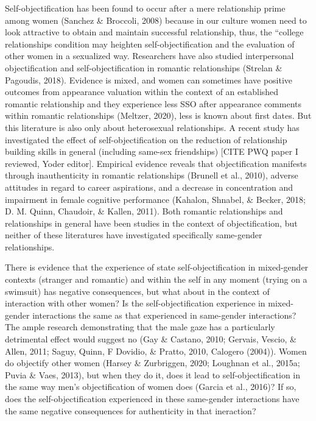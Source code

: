\documentclass[man]{apa6}
\begin{document}
Self-objectification has been found to occur after a mere relationship
prime among women (Sanchez \& Broccoli, 2008) because in our culture
women need to look attractive to obtain and maintain successful
relationship, thus, the ``college relationships condition may heighten
self-objectification and the evaluation of other women in a sexualized
way. Researchers have also studied interpersonal objectification and
self-objectification in romantic relationships (Strelan \& Pagoudis,
2018). Evidence is mixed, and women can sometimes have positive outcomes
from appearance valuation within the context of an established romantic
relationship and they experience less SSO after appearance comments
within romantic relationships (Meltzer, 2020), less is known about first
dates. But this literature is also only about heterosexual
relationships. A recent study has investigated the effect of
self-objectification on the reduction of relationship building skills in
general (including same-sex friendships) {[}CITE PWQ paper I reviewed,
Yoder editor{]}. Empirical evidence reveals that objectification
manifests through inauthenticity in romantic relationships (Brunell et
al., 2010), adverse attitudes in regard to career aspirations, and a
decrease in concentration and impairment in female cognitive performance
(Kahalon, Shnabel, \& Becker, 2018; D. M. Quinn, Chaudoir, \& Kallen,
2011). Both romantic relationships and relationships in general have
been studies in the context of objectification, but neither of these
literatures have investigated specifically same-gender relationships.

There is evidence that the experience of state self-objectification in
mixed-gender contexts (stranger and romantic) and within the self in any
moment (trying on a swimsuit) has negative consequences, but what about
in the context of interaction with other women? Is the
self-objectification experience in mixed-gender interactions the same as
that experienced in same-gender interactions? The ample research
demonstrating that the male gaze has a particularly detrimental effect
would suggest no (Gay \& Castano, 2010; Gervais, Vescio, \& Allen, 2011;
Saguy, Quinn, F Dovidio, \& Pratto, 2010, Calogero (2004)). Women do
objectify other women (Harsey \& Zurbriggen, 2020; Loughnan et al.,
2015a; Puvia \& Vaes, 2013), but when they do it, does it lead to
self-objectification in the same way men's objectification of women does
(Garcia et al., 2016)? If so, does the self-objectification experienced
in these same-gender interactions have the same negative consequences
for authenticity in that ineraction?
\end{document}

